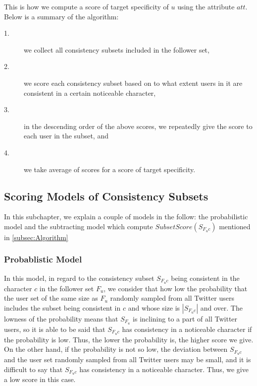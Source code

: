 This is how we compute a score of target specificity of $u$ using the
attribute $\mathit{att}$.  Below is a summary of the algorithm:

\begin{description}
\item[1.]  we collect all consistency subsets included in the follower set,
\item[2.]  we score each consistency subset based on to what extent users
           in it are consistent in a certain noticeable character,
\item[3.]  in the descending order of the above scores, we repeatedly
           give the score to each user in the subset, and
\item[4.]  we take average of scores for a score of target specificity.
\end{description}

\subsection{Scoring Models of Consistency Subsets}
\label{subsec:Scoring}

In this subchapter, we explain a couple of models in the follow: the
probabilistic model and the subtracting model which compute
$\mathit{SubsetScore(S_{F_uc})}$ mentioned in \ref{subsec:Algorithm}

\subsubsection{Probablistic Model}
\label{subsubsec:Probablistic}

In this model, in regard to the consistency subset $S_{F_uc}$ being
consistent in the character $c$ in the follower set $F_u$, we consider
that how low the probability that the user set of the same size as $F_u$
randomly sampled from all Twitter users includes the subset
being consistent in $c$ and whose size is $|S_{F_uc}|$ and over.
The lowness of the probability means that $S_{F_u}$ is inclining to
a part of all Twitter users, so it is able to be said that
$S_{F_uc}$ has consistency in a noticeable character if the probability
is low.  Thus, the lower the probability is, the higher score we give.
On the other hand, if the probability is
not so low,  the deviation between $S_{F_uc}$ and the user set randomly
sampled from all Twitter users may be small, and it is difficult to say
that $S_{F_uc}$ has consistency in a noticeable character.  Thus, we
give a low score in this case.

